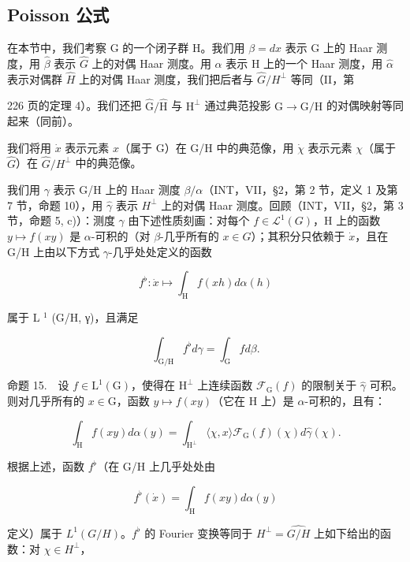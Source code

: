 \subsection{Poisson 公式}

在本节中，我们考察 G 的一个闭子群 H。我们用 \(\beta = dx\) 表示 G 上的 Haar 测度，用 \(\widehat{\beta}\) 表示 \(\widehat{G}\) 上的对偶 Haar 测度。用 \(\alpha\) 表示 H 上的一个 Haar 测度，用 \(\widehat{\alpha}\) 表示对偶群 \(\widehat{H}\) 上的对偶 Haar 测度，我们把后者与 \(\widehat{G}/H^{\perp}\) 等同（II，第

226 页的定理 4）。我们还把 \(\widehat{\mathrm{G}}/\widehat{\mathrm{H}}\) 与 \(\mathrm{H}^{\perp}\) 通过典范投影 \(\mathrm{G}\to\mathrm{G}/\mathrm{H}\) 的对偶映射等同起来（同前）。

我们将用 \(\dot{x}\) 表示元素 \(x\)（属于 G）在 G/H 中的典范像，用 \(\dot{\chi}\) 表示元素 \(\chi\)（属于 \(\widehat{G}\)）在 \(\widehat{G}/H^{\perp}\) 中的典范像。

我们用 \(\gamma\) 表示 G/H 上的 Haar 测度 \(\beta/\alpha\)（INT，VII，§2，第 2 节，定义 1 及第 7 节，命题 10），用 \(\widehat{\gamma}\) 表示 \(H^{\perp}\) 上的对偶 Haar 测度。回顾（INT，VII，§2，第 3 节，命题 5, c)）：测度 \(\gamma\) 由下述性质刻画：对每个 \(f \in \mathcal{L}^{1}(G)\)，H 上的函数 \(y \mapsto f(xy)\) 是 \(\alpha\)-可积的（对 \(\beta\)-几乎所有的 \(x \in G\)）；其积分只依赖于 \(\dot{x}\)，且在 G/H 上由以下方式 \(\gamma\)-几乎处处定义的函数

\[
f ^ {\flat} \colon \dot {x} \mapsto \int_ {\mathrm{H}} f (x h) d \alpha (h)
\]

属于 L \(^{1}\) (G/H, γ)，且满足

\[
\int_ {\mathrm{G} / \mathrm{H}} f ^ {\flat} d \gamma = \int_ {\mathrm{G}} f d \beta .\tag{33}
\]

命题 15.　设 \(f \in \mathrm{L}^1(\mathrm{G})\)，使得在 \(\mathrm{H}^\perp\) 上连续函数 \(\mathcal{F}_{\mathrm{G}}(f)\) 的限制关于 \(\widehat{\gamma}\) 可积。则对几乎所有的 \(x \in \mathrm{G}\)，函数 \(y \mapsto f(xy)\)（它在 \(\mathrm{H}\) 上）是 \(\alpha\)-可积的，且有：

\[
\int_ {\mathrm{H}} f (x y) d \alpha (y) = \int_ {\mathrm{H} ^ {\perp}} \langle \chi , x \rangle \mathcal {F} _ {\mathrm{G}} (f) (\chi) d \widehat {\gamma} (\chi).
\]

根据上述，函数 \(f^{\flat}\)（在 G/H 上几乎处处由

\[
f ^ {\flat} (\dot {x}) = \int_ {\mathrm{H}} f (x y) d \alpha (y)
\]

定义）属于 \(L^{1}(G/H)\)。\(f^{\flat}\) 的 Fourier 变换等同于 \(H^{\perp} = \widehat{G/H}\) 上如下给出的函数：对 \(\chi \in H^{\perp}\)，

